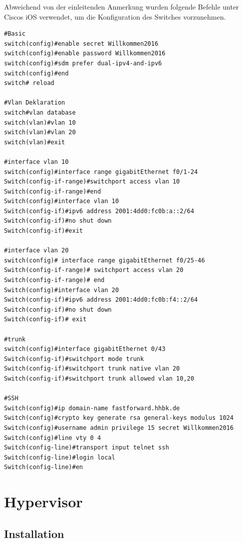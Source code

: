 Abweichend von der einleitenden Anmerkung wurden folgende Befehle unter Ciscos iOS verwendet, um die Konfiguration des Switches vorzunehmen.

\begin{lstlisting}[numbers=none]
#Basic
switch(config)#enable secret Willkommen2016
switch(config)#enable password Willkommen2016
switch(config)#sdm prefer dual-ipv4-and-ipv6
switch(config)#end
switch# reload

#Vlan Deklaration
switch#vlan database 
switch(vlan)#vlan 10
switch(vlan)#vlan 20
switch(vlan)#exit

#interface vlan 10
switch(config)#interface range gigabitEthernet f0/1-24 
Switch(config-if-range)#switchport access vlan 10
Switch(config-if-range)#end
Switch(config)#interface vlan 10
Switch(config-if)#ipv6 address 2001:4dd0:fc0b:a::2/64
Switch(config-if)#no shut down
Switch(config-if)#exit

#interface vlan 20
switch(config)# interface range gigabitEthernet f0/25-46
Switch(config-if-range)# switchport access vlan 20
Switch(config-if-range)# end
Switch(config)#interface vlan 20
Switch(config-if)#ipv6 address 2001:4dd0:fc0b:f4::2/64
Switch(config-if)#no shut down
Switch(config-if)# exit

#trunk
switch(config)#interface gigabitEthernet 0/43
Switch(config-if)#switchport mode trunk
Switch(config-if)#switchport trunk native vlan 20
Switch(config-if)#switchport trunk allowed vlan 10,20

#SSH
Switch(config)#ip domain-name fastforward.hhbk.de
Switch(config)#crypto key generate rsa general-keys modulus 1024
Switch(config)#username admin privilege 15 secret Willkommen2016
Switch(config)#line vty 0 4
Switch(config-line)#transport input telnet ssh
Switch(config-line)#login local
Switch(config-line)#en
\end{lstlisting}\section{Hypervisor}

\subsection{Installation}

